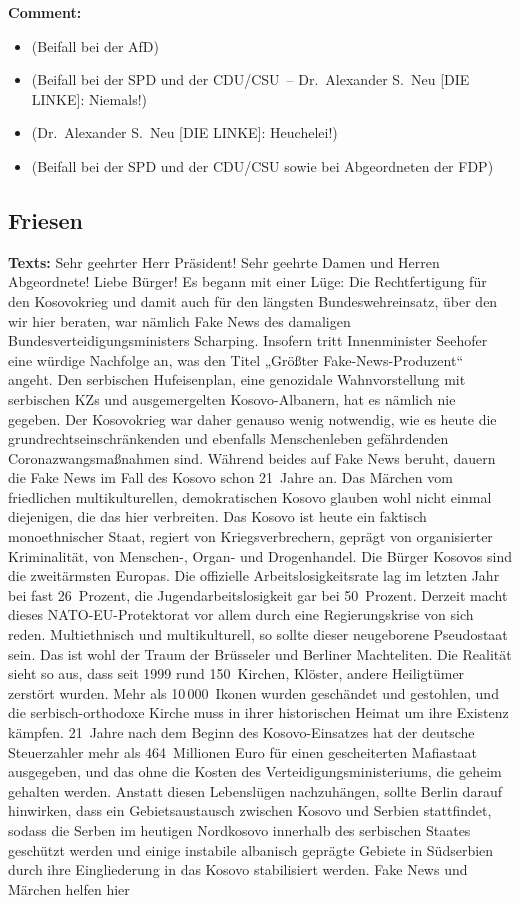 \documentclass{article}
\begin{document}
\noindent\textbf{Comment:}
\begin{itemize}
    \setlength\itemsep{-3pt}
    \item (Beifall bei der AfD)
    \setlength\itemsep{-3pt}
    \item (Beifall bei der SPD und der CDU/CSU – Dr. Alexander S. Neu [DIE LINKE]: Niemals!)
    \setlength\itemsep{-3pt}
    \item (Dr. Alexander S. Neu [DIE LINKE]: Heuchelei!)
    \setlength\itemsep{-3pt}
    \item (Beifall bei der SPD und der CDU/CSU sowie bei Abgeordneten der FDP)
\end{itemize}
\subsection{Friesen}
\noindent\textbf{Texts:} Sehr geehrter Herr Präsident! Sehr geehrte Damen und Herren Abgeordnete! Liebe Bürger! Es begann mit einer Lüge: Die Rechtfertigung für den Kosovokrieg und damit auch für den längsten Bundeswehreinsatz, über den wir hier beraten, war nämlich Fake News des damaligen Bundesverteidigungsministers Scharping. Insofern tritt Innenminister Seehofer eine würdige Nachfolge an, was den Titel „Größter Fake-News-Produzent“ angeht.  Den serbischen Hufeisenplan, eine genozidale Wahnvorstellung mit serbischen KZs und ausgemergelten Kosovo-Albanern, hat es nämlich nie gegeben. Der Kosovokrieg war daher genauso wenig notwendig, wie es heute die grundrechtseinschränkenden und ebenfalls Menschenleben gefährdenden Coronazwangsmaßnahmen sind.  Während beides auf Fake News beruht, dauern die Fake News im Fall des Kosovo schon 21 Jahre an.  Das Märchen vom friedlichen multikulturellen, demokratischen Kosovo glauben wohl nicht einmal diejenigen, die das hier verbreiten.  Das Kosovo ist heute ein faktisch monoethnischer Staat, regiert von Kriegsverbrechern, geprägt von organisierter Kriminalität, von Menschen-, Organ- und Drogenhandel. Die Bürger Kosovos sind die zweitärmsten Europas. Die offizielle Arbeitslosigkeitsrate lag im letzten Jahr bei fast 26 Prozent, die Jugendarbeitslosigkeit gar bei 50 Prozent. Derzeit macht dieses NATO-EU-Protektorat vor allem durch eine Regierungskrise von sich reden. Multiethnisch und multikulturell, so sollte dieser neugeborene Pseudostaat sein. Das ist wohl der Traum der Brüsseler und Berliner Machteliten. Die Realität sieht so aus, dass seit 1999 rund 150 Kirchen, Klöster, andere Heiligtümer zerstört wurden. Mehr als 10 000 Ikonen wurden geschändet und gestohlen, und die serbisch-orthodoxe Kirche muss in ihrer historischen Heimat um ihre Existenz kämpfen.  21 Jahre nach dem Beginn des Kosovo-Einsatzes hat der deutsche Steuerzahler mehr als 464 Millionen Euro für einen gescheiterten Mafiastaat ausgegeben, und das ohne die Kosten des Verteidigungsministeriums, die geheim gehalten werden. Anstatt diesen Lebenslügen nachzuhängen, sollte Berlin darauf hinwirken, dass ein Gebietsaustausch zwischen Kosovo und Serbien stattfindet, sodass die Serben im heutigen Nordkosovo innerhalb des serbischen Staates geschützt werden und einige instabile albanisch geprägte Gebiete in Südserbien durch ihre Eingliederung in das Kosovo stabilisiert werden.  Fake News und Märchen helfen hier 
\end{document}
